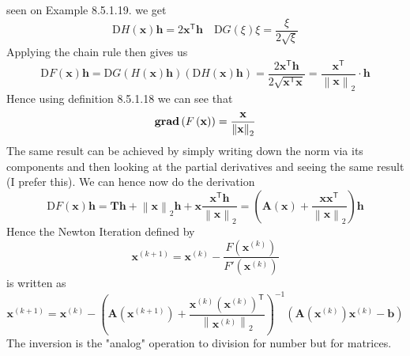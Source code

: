 \documentclass{article}
\begin{document}
seen on Example 8.5.1.19. we get
\begin{equation*}
    \mathrm{D}H\left(\mathbf{x}\right)\mathbf{h} = 2\mathbf{x}^{\mathsf{T}}\mathbf{h} \quad \mathrm{D}G\left(\xi\right)\xi = \frac{\xi}{2\sqrt{\xi}}
\end{equation*}
Applying the chain rule then gives us
\begin{equation*}
    \mathrm{D}F\left(\mathbf{x}\right)\mathbf{h} = \mathrm{D}G\left(H\left(\mathbf{x}\right)\mathbf{h}\right)\left(\mathrm{D}H\left(\mathbf{x}\right)\mathbf{h}\right) = \frac{2\mathbf{x}^{\mathsf{T}}\mathbf{h}}{2 \sqrt{\mathbf{x}^{\mathsf{T}}\mathbf{x}}} = \frac{\mathbf{x}^{\mathsf{T}}}{\left\lVert \mathbf{x} \right\rVert_{2}}\cdot \mathbf{h}
\end{equation*}
Hence using definition 8.5.1.18 we can see that 
\begin{equation*}
    \text{\textbf{grad}}\left(F\left(\mathbf{x}\right)\right) = \frac{\mathbf{x}}{\left\lVert \mathbf{x} \right\rVert_{2}}
\end{equation*}
The same result can be achieved by simply writing down the norm via its components and then looking at the partial derivatives and seeing the same result (I prefer this). We can hence now do the derivation
\begin{equation*}
    \mathrm{D}F\left(\mathbf{x}\right)\mathbf{h} = \mathbf{T}\mathbf{h} + \left\lVert \mathbf{x} \right\rVert_{2}\mathbf{h} + \mathbf{x}\frac{\mathbf{x}^{\mathsf{T}}\mathbf{h}}{\left\lVert \mathbf{x} \right\rVert_{2}} = \left(\mathbf{A}\left(\mathbf{x}\right) + \frac{\mathbf{x}\mathbf{x}^{\mathsf{T}}}{\left\lVert \mathbf{x} \right\rVert_{2}} \right) \mathbf{h}
\end{equation*}
Hence the Newton Iteration defined by
\begin{equation*}
    \mathbf{x}^{\left(k+1\right)} = \mathbf{x}^{\left(k\right)} - \frac{F\left(\mathbf{x}^{\left(k\right)}\right)}{F'\left(\mathbf{x}^{\left(k\right)}\right)}
\end{equation*}
is written as
\begin{equation*}
    \mathbf{x}^{\left(k+1\right)} = \mathbf{x}^{\left(k\right)} - \left(\mathbf{A}\left(\mathbf{x}^{\left(k+1\right)}\right) + \frac{\mathbf{x}^{\left(k\right)}\left(\mathbf{x}^{\left(k\right)}\right)^{\mathsf{T}}}{\left\lVert \mathbf{x}^{\left(k\right)} \right\rVert_{2}} \right)^{-1}\left(\mathbf{A}\left(\mathbf{x}^{\left(k\right)}\right)\mathbf{x}^{\left(k\right)} - \mathbf{b}\right)
\end{equation*}
The inversion is the "analog" operation to division for number but for matrices.
\end{document}

